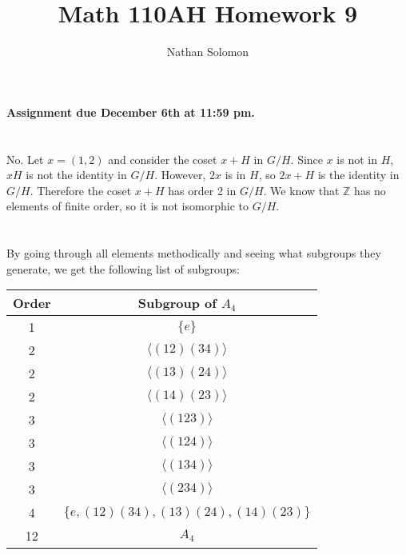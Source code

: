\documentclass[12pt]{article}
\begin{document}
\title{Math 110AH Homework 9}
\author{Nathan Solomon}
\maketitle

\textbf{Assignment due December 6th at 11:59 pm.}

\section{}
\noindent{}\bigskip

No. Let $x = (1,2)$ and consider the coset $x+H$ in $G/H$. Since $x$ is not in $H$, $xH$ is not the identity in $G/H$. However, $2x$ is in $H$, so $2x+H$ is the identity in $G/H$. Therefore the coset $x+H$ has order 2 in $G/H$. We know that $ \mathbb{Z} $ has no elements of finite order, so it is not isomorphic to $G/H$.

\section{}
\noindent{}\bigskip

By going through all elements methodically and seeing what subgroups they generate, we get the following list of subgroups:
\bigskip
\par
{\centering
\begin{tabular}{|c|c|}
    \hline
    Order & Subgroup of $A_4$ \\
    \hline
    \hline
    1 & $\{e\}$ \\
    \hline
    \hline
    2 & $\langle (12)(34) \rangle$ \\
    \hline
    2 & $\langle (13)(24) \rangle$ \\
    \hline
    2 & $\langle (14)(23) \rangle$ \\
    \hline
    \hline
    3 & $\langle (123) \rangle$ \\
    \hline
    3 & $\langle (124) \rangle$ \\
    \hline
    3 & $\langle (134) \rangle$ \\
    \hline
    3 & $\langle (234) \rangle$ \\
    \hline
    \hline
    4 & $\{ e, (12)(34), (13)(24), (14)(23) \}$ \\
    \hline
    \hline
    12 & $A_4$ \\
    \hline
\end{tabular}\par}
\end{document}
